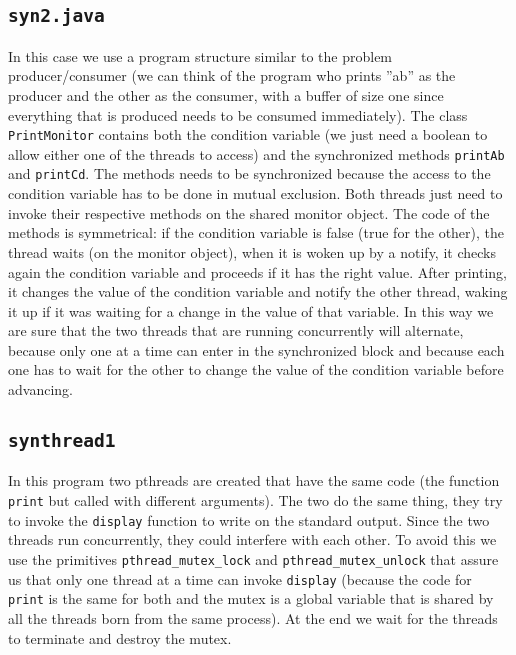 \subsection{\texttt{syn2.java}}
In this case we use a program structure similar to the problem producer/consumer (we can think of the program who prints ''ab'' as the producer and the other as the consumer, with a buffer of size one since everything that is produced needs to be consumed immediately). \newline
The class \texttt{PrintMonitor} contains both the condition variable (we just need a boolean to allow either one of the threads to access) and the synchronized methods \texttt{printAb} and \texttt{printCd}. The methods needs to be synchronized because the access to the condition variable has to be done in mutual exclusion. \newline
Both threads just need to invoke their respective methods on the shared monitor object. The code of the methods is symmetrical: if the condition variable is false (true for the other), the thread waits (on the monitor object), when it is woken up by a notify, it checks again the condition variable and proceeds if it has the right value. After printing, it changes the value of the condition variable and notify the other thread, waking it up if it was waiting for a change in the value of that variable. In this way we are sure that the two threads that are running concurrently will alternate, because only one at a time can enter in the synchronized block and because each one has to wait for the other to change the value of the condition variable before advancing.
\subsection{\texttt{synthread1}}
In this program two pthreads are created that have the same code (the function \texttt{print} but called with different arguments). The two do the same thing, they try to invoke the \texttt{display} function to write on the standard output. Since the two threads run concurrently, they could interfere with each other. To avoid this we use the primitives \texttt{pthread\_mutex\_lock} and \texttt{pthread\_mutex\_unlock} that assure us that only one thread at a time can invoke \texttt{display} (because the code for \texttt{print} is the same for both and the mutex is a global variable that is shared by all the threads born from the same process). At the end we wait for the threads to terminate and destroy the mutex.
